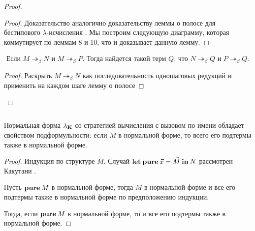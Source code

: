 \begin{proof}
\begin{proof}

Доказательство аналогично доказательству леммы о полосе для бестипового $\lambda$-исчисления \cite{Baren} \cite{Baren2}. Мы построим следующую диаграмму, которая коммутирует по леммам 8 и 10, что и доказывает данную лемму.

\vspace{\baselineskip}

\end{proof}

\begin{col}
$ $
Если $M \twoheadrightarrow_{\beta} N$ и $M \twoheadrightarrow_{\beta} P$. Тогда найдется такой терм $Q$, что
$N \twoheadrightarrow_{\beta} Q$ и $P \twoheadrightarrow_{\beta} Q$.
\end{col}

\begin{proof}

Раскрыть $M \twoheadrightarrow_{\beta} N$ как последовательность одношаговых редукций и применить на каждом шаге лемму о полосе
\end{proof}

\end{proof}

\begin{theorem}
$ $

Нормальная форма $\lambda_{{\bf K}}$ со стратегией вычисления с вызовом по имени обладает свойством подформульности: если $M$ в нормальной форме, то всего его подтермы также в нормальной форме.

\end{theorem}

\begin{proof}
Индукция по структуре $M$.
Случай ${\bf let \: pure\:} \vec{x} = \vec{M} {\: \bf in \:} N$ рассмотрен Какутани \cite{ModalK} \cite{ModalK1}.

Пусть ${\bf pure \:} M$ в нормальной форме, тогда $M$ в нормальной форме и все его подтермы также в нормальной форме по предположению индукции.

Тогда, если ${\bf pure \:} M$ в нормальной форме, то и все его подтермы также в нормальной форме.
\end{proof}
